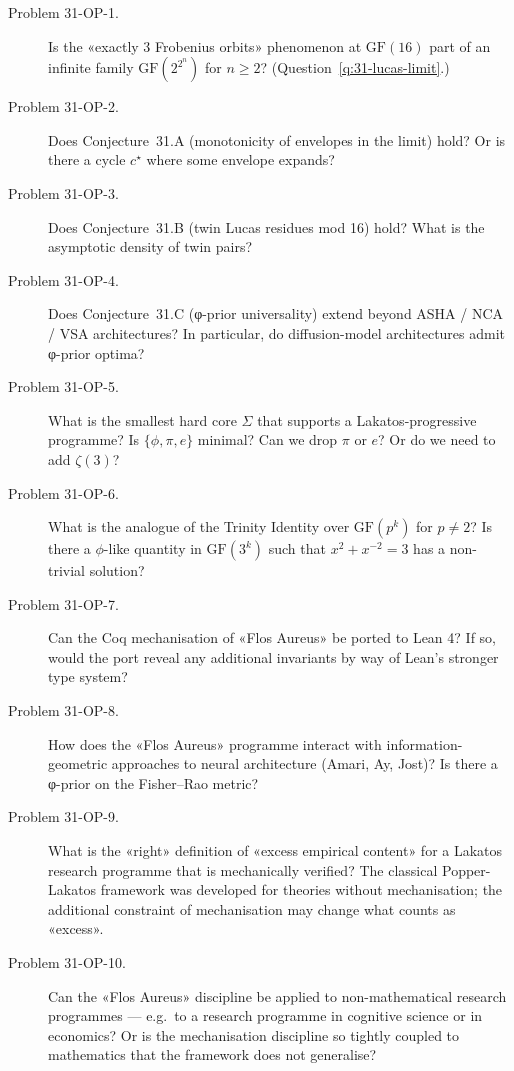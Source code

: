 \begin{description}
    \item[Problem 31-OP-1.] Is the «exactly 3 Frobenius orbits» phenomenon at $\mathrm{GF}(16)$ part of an infinite family $\mathrm{GF}(2^{2^{n}})$ for $n \geq 2$? (Question~\ref{q:31-lucas-limit}.)
    \item[Problem 31-OP-2.] Does Conjecture~31.A (monotonicity of envelopes in the limit) hold? Or is there a cycle $c^{\star}$ where some envelope expands?
    \item[Problem 31-OP-3.] Does Conjecture~31.B (twin Lucas residues mod 16) hold? What is the asymptotic density of twin pairs?
    \item[Problem 31-OP-4.] Does Conjecture~31.C (φ-prior universality) extend beyond ASHA / NCA / VSA architectures? In particular, do diffusion-model architectures admit φ-prior optima?
    \item[Problem 31-OP-5.] What is the smallest hard core $\Sigma$ that supports a Lakatos-progressive programme? Is $\{\phi, \pi, e\}$ minimal? Can we drop $\pi$ or $e$? Or do we need to add $\zeta(3)$?
    \item[Problem 31-OP-6.] What is the analogue of the Trinity Identity over $\mathrm{GF}(p^{k})$ for $p \neq 2$? Is there a $\phi$-like quantity in $\mathrm{GF}(3^{k})$ such that $x^{2} + x^{-2} = 3$ has a non-trivial solution?
    \item[Problem 31-OP-7.] Can the Coq mechanisation of «Flos Aureus» be ported to Lean 4? If so, would the port reveal any additional invariants by way of Lean's stronger type system?
    \item[Problem 31-OP-8.] How does the «Flos Aureus» programme interact with information-geometric approaches to neural architecture (Amari, Ay, Jost)? Is there a φ-prior on the Fisher–Rao metric?
    \item[Problem 31-OP-9.] What is the «right» definition of «excess empirical content» for a Lakatos research programme that is mechanically verified? The classical Popper-Lakatos framework was developed for theories without mechanisation; the additional constraint of mechanisation may change what counts as «excess».
    \item[Problem 31-OP-10.] Can the «Flos Aureus» discipline be applied to non-mathematical research programmes — e.g.\ to a research programme in cognitive science or in economics? Or is the mechanisation discipline so tightly coupled to mathematics that the framework does not generalise?
\end{description}

